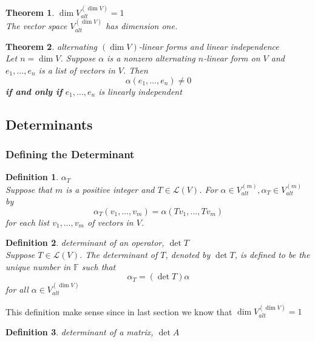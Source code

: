\documentclass{article}
\newtheorem{theorem}{Theorem}[subsection]
\newtheorem{definition}{Definition}[subsection]
\newcommand{\FF}{\mathbb{F}}
\begin{document}
\begin{CJK}{UTF8}{gkai}
\begin{theorem}
    $\dim V^{(\dim V)}_{alt}=1$\\

    The vector space $V^{(\dim V)}_{alt}$ has dimension one.
\end{theorem}

\begin{theorem}
    alternating $(\dim V)$-linear forms and linear independence\\

    Let $n = \dim V$. Suppose $\alpha$ is a nonzero alternating $n$-linear form on $V$ and
    $e_1, \ldots,e_n$ is a list of vectors in $V$. Then
    \[\alpha(e_1, \ldots,e_n) \neq 0\]
    \textbf{if and only if} $e_1,\ldots,e_n$ is linearly independent
\end{theorem}
\subsection{Determinants}

\subsubsection{Defining the Determinant}

\begin{definition}
    $\alpha_T$\\

    Suppose that $m$ is a positive integer and $T \in \mathcal{L}(V)$. For $\alpha \in V^{(m)}_{alt}, \alpha_T \in V^{(m)}_{alt}$ by
    \[\alpha_T(v_1,\ldots,v_m) = \alpha(Tv_1,\ldots,Tv_m)\]
    for each list $v_1,\ldots,v_m$ of vectors in $V$.
\end{definition}

\begin{definition}
    determinant of an operator, $\det T$\\

    Suppose $T \in \mathcal{L}(V)$. The determinant of $T$, denoted by $\det T$, is defined to be the unique number in $\FF$ such that
    \[ \alpha_T = (\det T)\alpha\]
    for all $\alpha \in V^{(\dim V)}_{alt}$
\end{definition}

This definition make sense since in last section we know that $\dim V^{(\dim V)}_{alt} = 1$\\

\begin{definition}
    determinant of a matrix, $\det A$\\


\end{definition}
\end{CJK}
\end{document}
